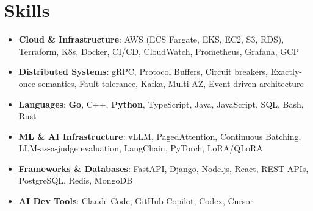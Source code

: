 \documentclass[letterpaper,11pt]{article}
\newcommand{\resumeSubHeadingListStart}{\begin{itemize}[leftmargin=0.15in, label={}]}
\newcommand{\resumeSubHeadingListEnd}{\end{itemize}}
\newcommand{\resumeSkillHeading}[2]{%
  \item\small{\textbf{#1}: #2 \vspace{-9pt}}%
}
\begin{document}
\section{Skills}
  \resumeSubHeadingListStart
    \resumeSkillHeading{Cloud \& Infrastructure}{AWS (ECS Fargate, EKS, EC2, S3, RDS), Terraform, K8s, Docker, CI/CD, CloudWatch, Prometheus, Grafana, GCP}
    \resumeSkillHeading{Distributed Systems}{gRPC, Protocol Buffers, Circuit breakers, Exactly-once semantics, Fault tolerance, Kafka, Multi-AZ, Event-driven architecture}
    \resumeSkillHeading{Languages}{\textbf{Go}, C++, \textbf{Python}, TypeScript, Java, JavaScript, SQL, Bash, Rust}
    \resumeSkillHeading{ML \& AI Infrastructure}{vLLM, PagedAttention, Continuous Batching, LLM-as-a-judge evaluation, LangChain, PyTorch, LoRA/QLoRA}
    \resumeSkillHeading{Frameworks \& Databases}{FastAPI, Django, Node.js, React, REST APIs, PostgreSQL, Redis, MongoDB}
    \resumeSkillHeading{AI Dev Tools}{Claude Code, GitHub Copilot, Codex, Cursor}
  \resumeSubHeadingListEnd
\end{document}
